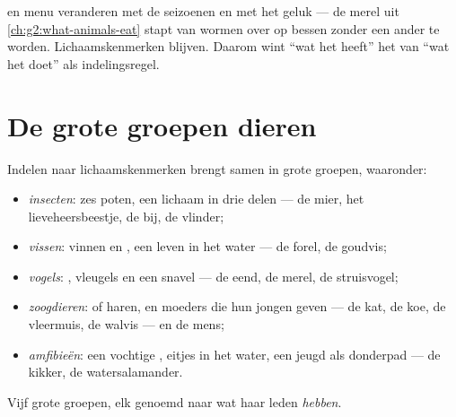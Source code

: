 \begin{remark}\label{rem:g3:sorting-living-things:why}
 en menu veranderen met de seizoenen en met het geluk --- de
merel uit \cref{ch:g2:what-animals-eat} stapt van wormen over op bessen
zonder een ander  te worden. Lichaamskenmerken blijven. Daarom wint
``wat het heeft'' het van ``wat het doet'' als indelingsregel.
\end{remark}

\section{De grote groepen dieren}

\begin{proposition}\label{prop:g3:sorting-living-things:groups}
Indelen naar lichaamskenmerken brengt  samen in grote groepen,
waaronder:
\begin{itemize}
  \item \emph{insecten}: zes poten, een lichaam in drie
        delen --- de mier, het lieveheersbeestje, de bij, de vlinder;
  \item \emph{vissen}: vinnen en , een leven in het
        water --- de forel, de goudvis;
  \item \emph{vogels}: , vleugels en een snavel ---
        de eend, de merel, de struisvogel;
  \item \emph{zoogdieren}:  of haren, en moeders
        die hun jongen  geven --- de kat, de koe, de vleermuis, de
        walvis --- en de mens;
  \item \emph{amfibieën}: een vochtige , eitjes in
        het water, een jeugd als donderpad --- de kikker, de watersalamander.
\end{itemize}
\end{proposition}
\admitted

\begin{omfigure}

{\small Vijf grote groepen, elk genoemd naar wat haar leden
\emph{hebben}.}
\end{omfigure}

